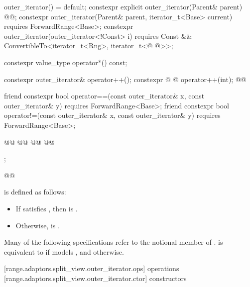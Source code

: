 {\begin{codeblock}
{{    outer_iterator() = default;
    constexpr explicit outer_iterator(Parent& parent)
      @@;
    constexpr outer_iterator(Parent& parent, iterator_t<Base> current)
      requires ForwardRange<Base>;
    constexpr outer_iterator(outer_iterator<!Const> i) requires Const &&
      ConvertibleTo<iterator_t<Rng>, iterator_t<@ @>>;

    constexpr value_type operator*() const;

    constexpr outer_iterator& operator++();
    constexpr @ @ operator++(int);
    @@

    friend constexpr bool operator==(const outer_iterator& x, const outer_iterator& y)
      requires ForwardRange<Base>;
    friend constexpr bool operator!=(const outer_iterator& x, const outer_iterator& y)
      requires ForwardRange<Base>;

    @@
    @@
    @@
    @@
  };
}@\oldtxt{\}}@
\end{codeblock}

{\color{oldclr}
\pnum
{} is defined
as follows:
\begin{itemize}
\item If  satisfies ,
then  is .

\item Otherwise,  is .
\end{itemize}
} %

{\color{newclr}
\pnum
Many of the following specifications refer to the notional member
 of .
 is equivalent to  if 
models , and  otherwise.
} %

[range.adaptors.split_view.outer_iterator.ops]{ operations}
[range.adaptors.split_view.outer_iterator.ctor]{ constructors}

}
